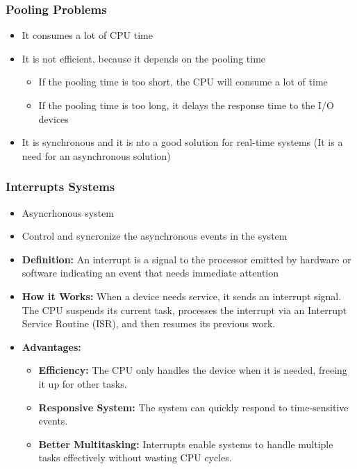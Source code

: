 
\begin{frame}
    \frametitle{Pooling Problems}
    \begin{itemize}
        \item It consumes a lot of CPU time
        \item It is not efficient, because it depends on the pooling time
        \begin{itemize}
            \item If the pooling time is too short, the CPU will consume a lot of time
            \item If the pooling time is too long, it delays the response time to the I/O devices
        \end{itemize}
        \item It is synchronous and it is nto a good solution for real-time systems (It is a need for an asynchronous solution)
    \end{itemize}
\end{frame}

\begin{frame}
    \frametitle{Interrupts Systems}
    \begin{itemize}
        \item Asyncrhonous system
        \item Control and syncronize the asynchronous events in the system
        \item \textbf{Definition:} An interrupt is a signal to the processor emitted by hardware or software indicating an event that needs immediate attention
        \item \textbf{How it Works:} When a device needs service, it sends an interrupt signal. The CPU suspends its current task, processes the interrupt via an Interrupt Service Routine (ISR), and then resumes its previous work.
        \item \textbf{Advantages:}
        \begin{itemize}
            \item \textbf{Efficiency:} The CPU only handles the device when it is needed, freeing it up for other tasks.
            \item \textbf{Responsive System:} The system can quickly respond to time-sensitive events.
            \item \textbf{Better Multitasking:} Interrupts enable systems to handle multiple tasks effectively without wasting CPU cycles.
        \end{itemize}
    \end{itemize}
\end{frame}

